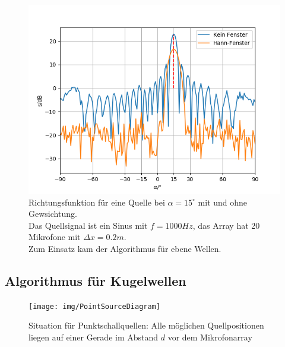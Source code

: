 	\begin{figure}[h]
		\begin{center}
			\includegraphics[scale=0.7]{img/bsp_plot_15_beides.png}
			\captionsetup{justification=centering}
			\caption{Richtungsfunktion für eine Quelle bei $\alpha=15^{\circ}$ mit und ohne Gewsichtung. \\
				Das Quellsignal ist ein Sinus mit $f=1000Hz$, das Array hat 20 Mikrofone mit $\Delta x = 0.2m$.\\
				Zum Einsatz kam der Algorithmus für ebene Wellen.}
			\label{fig:bsp_plot}
		\end{center}
	\end{figure}

\subsection{Algorithmus für Kugelwellen}

	\begin{figure}[h]
		\begin{center}
			\texttt{[image: img/PointSourceDiagram]}
			\captionsetup{justification=centering}
			\caption{Situation für Punktschallquellen: Alle möglichen Quellpositionen liegen auf einer Gerade im Abstand $d$ vor dem Mikrofonarray}
		\end{center}
	\end{figure}

